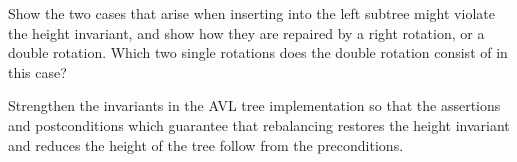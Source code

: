 \begin{exercise}
\label{exc:insert-left}
Show the two cases that arise when inserting into the
left subtree might violate the height invariant, and show
how they are repaired by a right rotation, or a double
rotation.  Which two single rotations does the double
rotation consist of in this case?
\end{exercise}

\begin{exercise}
\label{exc:avl-invs}
Strengthen the invariants in the AVL tree implementation
so that the assertions and postconditions which guarantee that rebalancing
restores the height invariant and reduces the height
of the tree follow from the preconditions.
\end{exercise}
